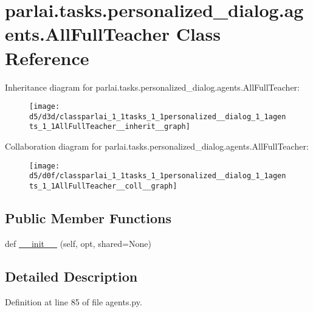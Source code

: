 \hypertarget{classparlai_1_1tasks_1_1personalized__dialog_1_1agents_1_1AllFullTeacher}{}\section{parlai.\+tasks.\+personalized\+\_\+dialog.\+agents.\+All\+Full\+Teacher Class Reference}
\label{classparlai_1_1tasks_1_1personalized__dialog_1_1agents_1_1AllFullTeacher}


Inheritance diagram for parlai.\+tasks.\+personalized\+\_\+dialog.\+agents.\+All\+Full\+Teacher\+:
\nopagebreak
\begin{figure}[H]
\begin{center}
\leavevmode
\texttt{[image: d5/d3d/classparlai\_1\_1tasks\_1\_1personalized\_\_dialog\_1\_1agents\_1\_1AllFullTeacher\_\_inherit\_\_graph]}
\end{center}
\end{figure}


Collaboration diagram for parlai.\+tasks.\+personalized\+\_\+dialog.\+agents.\+All\+Full\+Teacher\+:
\nopagebreak
\begin{figure}[H]
\begin{center}
\leavevmode
\texttt{[image: d5/d0f/classparlai\_1\_1tasks\_1\_1personalized\_\_dialog\_1\_1agents\_1\_1AllFullTeacher\_\_coll\_\_graph]}
\end{center}
\end{figure}
\subsection*{Public Member Functions}
\begin{DoxyCompactItemize}
\item 
def \hyperlink{classparlai_1_1tasks_1_1personalized__dialog_1_1agents_1_1AllFullTeacher_a0ff199f278a48cb4c7979503ef501916}{\+\_\+\+\_\+init\+\_\+\+\_\+} (self, opt, shared=None)
\end{DoxyCompactItemize}


\subsection{Detailed Description}


Definition at line 85 of file agents.\+py.



